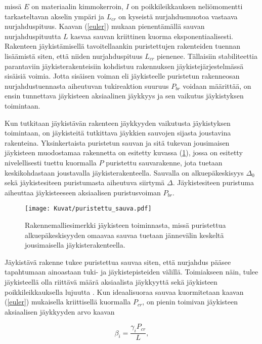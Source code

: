 \documentclass[12pt]{article}
\newenvironment{content}{\pagenumbering{arabic}}{}
\begin{document}
\begin{content}
missä $E$ on materiaalin kimmokerroin, $I$ on poikkileikkauksen neliömomentti tarkasteltavan akselin ympäri ja $L_{cr}$ on kyseistä nurjahdusmuotoa vastaava nurjahduspituus. Kaavan (\ref{euler}) mukaan pienentämällä sauvan nurjahduspituutta $L$ kasvaa sauvan kriittinen kuorma eksponentiaalisesti. Rakenteen jäykistämisellä tavoitellaankin puristettujen rakenteiden tuennan lisäämistä siten, että niiden nurjahduspituus $L_{cr}$ pienenee. Tällaisiin stabiliteettia parantaviin jäykisterakenteisiin kohdistuu rakennuksen jäykistejärjestelmässä sisäisiä voimia. Jotta sisäisen voiman eli jäykisteelle puristetun rakenneosan nurjahdustuennasta aiheutuvan tukireaktion suuruus $P_{br}$ voidaan määrittää, on ensin tunnettava jäykisteen aksiaalinen jäykkyys ja sen vaikutus jäykistyksen toimintaan. 

Kun tutkitaan jäykistävän rakenteen jäykkyyden vaikutusta jäykistyksen toimintaan, on jäykisteitä tutkittava jäykkien sauvojen sijasta joustavina rakenteina. Yksinkertaista puristetun sauvan ja sitä tukevan jousimaisen jäykisteen muodostamaa rakennetta on esitetty kuvassa (\ref{fig:puristettu_sauva}), jossa on esitetty nivelellisesti tuettu kuormalla $P$ puristettu sauvarakenne, jota tuetaan keskikohdastaan joustavalla jäykisterakenteella. Sauvalla on alkuepäkeskisyys $\Delta_0$ sekä jäykistesiteen puristumasta aiheutuva siirtymä $\Delta$. Jäykistesiteen puristuma aiheuttaa jäykisteeseen aksiaalisen puristusvoiman $P_{br}$.

\begin{figure}[htb]
\centering
\texttt{[image: Kuvat/puristettu\_sauva.pdf]}
\caption{Rakennemalliesimerkki jäykisteen toiminnasta, missä puristettua alkuepäkeskisyyden omaavaa sauvaa tuetaan jännevälin keskeltä jousimaisella jäykisterakenteella.}
\label{fig:puristettu_sauva}
\end{figure}

Jäykistävä rakenne tukee puristettua sauvaa siten, että nurjahdus pääsee tapahtumaan ainoastaan tuki- ja jäykistepisteiden välillä. Toimiakseen näin, tulee jäykisteellä olla riittävä määrä aksiaalista jäykkyyttä sekä jäykisteen poikkileikkauksella lujuutta \parencite{winter}. Kun ideaalisuoraa sauvaa kuormitetaan kaavan (\ref{euler}) mukaisella kriittisellä kuormalla $P_{cr}$, on pienin toimivan jäykisteen aksiaalisen jäykkyyden arvo kaavan

\begin{equation}
\label{ideaalijäykkyys}
\beta_i = \frac{\gamma_i P_{cr}}{L},
\end{equation}


\end{content}
\end{document}
